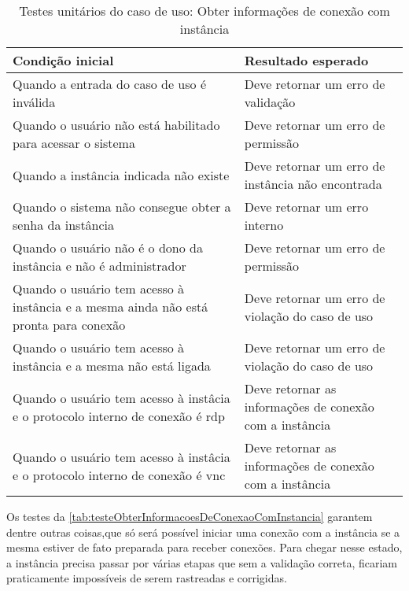 \begin{table}[h]
\caption{Testes unitários do caso de uso: Obter informações de conexão com instância} 
\label{tab:testeObterInformacoesDeConexaoComInstancia}
\begin{tabularx}{\textwidth}{p{} p{}}
\toprule
\textbf{Condição inicial} & \textbf{Resultado esperado} \\ \midrule

Quando a entrada do caso de uso é inválida & Deve retornar um erro de validação \\ \hline

Quando o usuário não está habilitado para acessar o sistema & Deve retornar um erro de permissão \\ \hline

Quando a instância indicada não existe & Deve retornar um erro de instância não encontrada \\ \hline

Quando o sistema não consegue obter a senha da instância & Deve retornar um erro interno \\ \hline

Quando o usuário não é o dono da instância e não é administrador & Deve retornar um erro de permissão \\ \hline

Quando o usuário tem acesso à instância e a mesma ainda não está pronta para conexão & Deve retornar um erro de violação do caso de uso \\ \hline

Quando o usuário tem acesso à instância e a mesma não está ligada & Deve retornar um erro de violação do caso de uso \\ \hline

Quando o usuário tem acesso à instâcia e o protocolo interno de conexão é \gls{rdp} & Deve retornar as informações de conexão com a instância \\ \hline

Quando o usuário tem acesso à instâcia e o protocolo interno de conexão é \gls{vnc} & Deve retornar as informações de conexão com a instância \\

\bottomrule
\end{tabularx}
\end{table}

Os testes da \autoref{tab:testeObterInformacoesDeConexaoComInstancia} garantem dentre outras coisas,que só será possível iniciar uma conexão com a instância se a mesma estiver de fato preparada para receber conexões. Para chegar nesse estado, a instância precisa passar por várias etapas que sem a validação correta, ficariam praticamente impossíveis de serem rastreadas e corrigidas.


